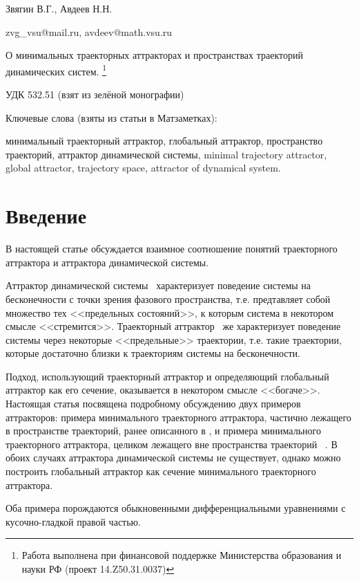\documentclass[a4paper]{article} %
\begin{document}
Звягин В.Г., Авдеев Н.Н.

zvg\_vsu@mail.ru, avdeev@math.vsu.ru

О минимальных траекторных аттракторах и пространствах траекторий динамических систем.
\footnote{
	Работа выполнена при финансовой поддержке Министерства образования и науки РФ
	(проект 14.Z50.31.0037)
}

УДК 532.51 (взят из зелёной монографии)

Ключевые слова (взяты из статьи в Матзаметках):

минимальный траекторный аттрактор, глобальный аттрактор, пространство траекторий, аттрактор динамической системы,
minimal trajectory attractor, global attractor, trajectory space, attractor of dynamical system.



\section{Введение}
В настоящей статье обсуждается взаимное соотношение понятий траекторного аттрактора и аттрактора динамической системы.

Аттрактор динамической системы~\cite{Vishik}
характеризует поведение системы на бесконечности с точки зрения фазового пространства,
т.е. предтавляет собой множество тех <<предельных состояний>>, к которым система в некотором смысле <<стремится>>.
Траекторный аттрактор~\cite{Vorotnikov,Kondratyev} же характеризует поведение системы
через некоторые <<предельные>> траектории, т.е. такие траектории,
которые достаточно близки к траекториям системы на бесконечности.

Подход, использующий траекторный аттрактор и определяющий глобальный аттрактор как его сечение,
оказывается в некотором смысле <<богаче>>.
Настоящая статья посвящена подробному обсуждению двух примеров аттракторов:
примера минимального траекторного аттрактора,
частично лежащего в пространстве траекторий, ранее описанного в \cite{Zelenaya},
и примера минимального траекторного аттрактора, целиком лежащего вне пространства траекторий
~\cite{mzmZvAv,vvmshZvAv}.
В обоих случаях аттрактора динамической системы не существует,
однако можно построить глобальный аттрактор как сечение минимального траекторного аттрактора.

Оба примера порождаются обыкновенными дифференциальными уравнениями с кусочно-гладкой правой частью.



\end{document}
